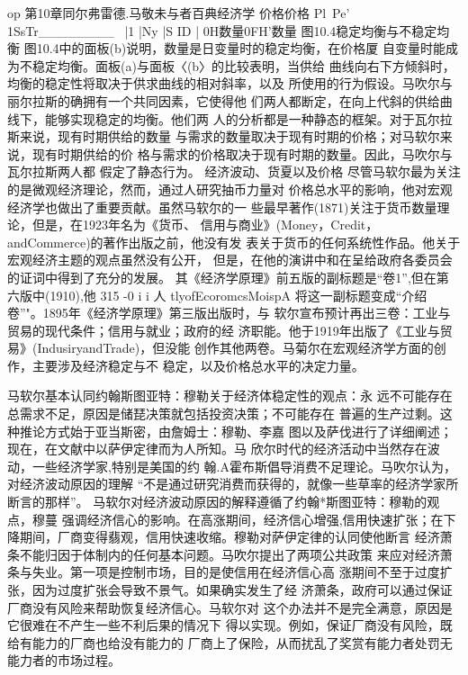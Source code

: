 op
第10章同尔弗雷德.马敬未与者百典经济学
价格价格
Pl~Pe'
1SsTr________~
|1
|Ny
|S
ID
|
0H数量0FH’数量
图10.4稳定均衡与不稳定均衡
图10.4中的面板(b)说明，数量是日变量时的稳定均衡，在价格厦
自变量时能成为不稳定均衡。面板(a)与面板〈(b〉的比较表明，当供给
曲线向右下方倾斜时，均衡的稳定性将取决于供求曲线的相对斜率，以及
所使用的行为假设。马吹尔与丽尔拉斯的确拥有一个共同因素，它使得他
们两人都断定，在向上代斜的供给曲线下，能够实现稳定的均衡。他们两
人的分析都是一种静态的框架。对于瓦尔拉斯来说，现有时期供给的数量
与需求的数量取决于现有时期的价格；对马软尔来说，现有时期供给的价
格与需求的价格取决于现有时期的数量。因此，马吹尔与瓦尔拉斯两人都
假定了静态行为。
经济波动、货夏以及价格
尽管马软尔最为关注的是微观经济理论，然而，通过人研究抽币力量对
价格总水平的影响，他对宏观经济学也做出了重要贡献。虽然马软尔的一
些最早著作(1871)关注于货币数量理论，但是，在1923年名为《货币、
信用与商业》(Money，Credit，andCommerce)的著作出版之前，他没有发
表关于货币的任何系统性作品。他关于宏观经济主题的观点虽然没有公开，
但是，在他的演讲中和在呈给政府各委员会的证词中得到了充分的发展。
其《经济学原理》前五版的副标题是“卷1”,但在第六版中(1910),他
315
-0
i
i
人
tlyofEcoromcsMoispA
将这一副标题变成“介绍卷”"。1895年《经济学原理》第三版出版时，与
软尔宣布预计再出三卷：工业与贸易的现代条件；信用与就业；政府的经
济职能。他于1919年出版了《工业与贸易》(IndusiryandTrade)，但没能
创作其他两卷。马菊尔在宏观经济学方面的创作，主要涉及经济稳定与不
稳定，以及价格总水平的决定力量。

马软尔基本认同约翰斯图亚特：穆勒关于经济体稳定性的观点：永
远不可能存在总需求不足，原因是储琵决策就包括投资决策；不可能存在
普遍的生产过剩。这种推论方式始于亚当斯密，由詹姆士：穆勒、李嘉
图以及萨伐进行了详细阐述；现在，在文献中以萨伊定律而为人所知。马
欣尔时代的经济活动中当然存在波动，一些经济学家,特别是美国的约
翰.A霍布斯倡导消费不足理论。马吹尔认为，对经济波动原因的理解
“不是通过研究消费而获得的，就像一些草率的经济学家所断言的那样”。
马软尔对经济波动原因的解释遵循了约翰*斯图亚特：穆勒的观点，穆蔓
强调经济信心的影响。在高涨期间，经济信心增强,信用快速扩张；在下
降期间，厂商变得翡观，信用快速收缩。穆勒对萨伊定律的认同使他断言
经济萧条不能归因于体制内的任何基本问题。马吹尔提出了两项公共政策
来应对经济萧条与失业。第一项是控制市场，目的是使信用在经济信心高
涨期间不至于过度扩张，因为过度扩张会导致不景气。如果确实发生了经
济萧条，政府可以通过保证厂商没有风险来帮助恢复经济信心。马软尔对
这个办法并不是完全满意，原因是它很难在不产生一些不利后果的情况下
得以实现。例如，保证厂商没有风险，既给有能力的厂商也给没有能力的
厂商上了保险，从而扰乱了奖赏有能力者处罚无能力者的市场过程。


